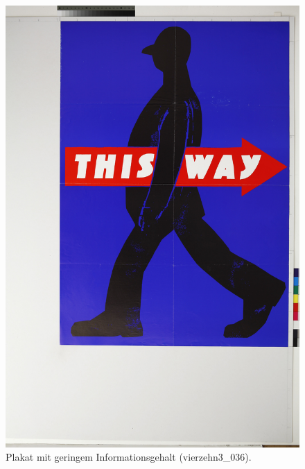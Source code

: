 \documentclass[a4paper,12pt,ngerman]{article}
\begin{document}
\newpage
\begin{figure}[ht]
\includegraphics[width=\linewidth]{Abbildung_15_(vierzehn3_036)}
\centering
\caption{Plakat mit geringem Informationsgehalt (vierzehn3\_036).}
\end{figure}
\end{document}

